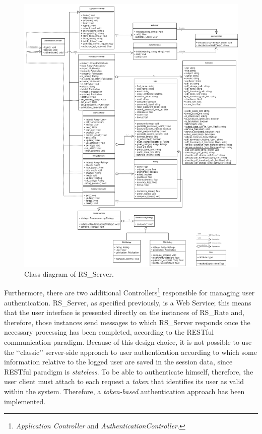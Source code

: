 \documentclass[a4paper, english]{article}
\begin{document}
\begin{figure}[!tbp]
\centering
\includegraphics[scale=0.4]{figures/classi-1.png}
\caption{Class diagram of RS\_Server.}
\label{fig:class-1}
\end{figure}

Furthermore, there are two additional Controllers\footnote{\emph{Application Controller} and \emph{AuthenticationController}.} responsible for managing user authentication. RS\_Server, as specified previously, is a Web Service; this means that the user interface is presented directly on the instances of RS\_Rate and, therefore, those instances send messages to which RS\_Server responds once the necessary processing has been completed, according to the RESTful communication paradigm. Because of this design choice, it is not possible to use the \lq\lq classic\rq\rq{} server-side approach to user authentication according to which some information relative to the logged user are saved in the session data, since RESTful paradigm is \emph{stateless}. To be able to authenticate himself, therefore, the user client must attach to each request a \emph{token} that identifies its user as valid within the system. Therefore, a \emph{token-based} authentication approach has been implemented.
\end{document}
